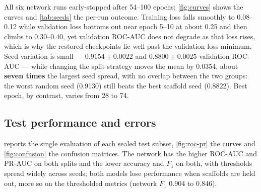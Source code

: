 All six network runs early-stopped after 54--100 epochs; \cref{fig:curves} shows the curves and \cref{tab:seeds} the per-run outcome. Training loss falls smoothly to 0.08--0.12 while validation loss bottoms out near epoch 5--10 at about 0.25 and then climbs to 0.30--0.40, yet validation ROC-AUC does not degrade as that loss rises, which is why the restored checkpoints lie well past the validation-loss minimum. Seed variation is small --- $0.9154 \pm 0.0022$ and $0.8800 \pm 0.0025$ validation ROC-AUC --- while changing the split strategy moves the mean by 0.0354, about \textbf{seven times} the largest seed spread, with no overlap between the two groups: the worst random seed (0.9130) still beats the best scaffold seed (0.8822). Best epoch, by contrast, varies from 28 to 74.

\subsection{Test performance and errors}

 reports the single evaluation of each sealed test subset, \cref{fig:roc-pr} the curves and \cref{fig:confusion} the confusion matrices. The network has the higher ROC-AUC and PR-AUC on both splits and the lower accuracy and $F_1$ on both, with thresholds spread widely across seeds; both models lose performance when scaffolds are held out, more so on the thresholded metrics (network $F_1$ 0.904 to 0.846).

